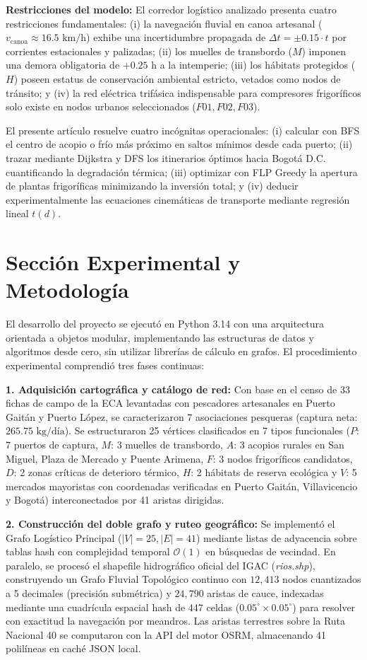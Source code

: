 \documentclass[10pt,twocolumn,a4paper]{article}
\begin{document}
\textbf{Restricciones del modelo:} El corredor logístico analizado presenta cuatro restricciones fundamentales: (i) la navegación fluvial en canoa artesanal ($v_{\text{canoa}} \approx 16.5\text{ km/h}$) exhibe una incertidumbre propagada de $\Delta t = \pm 0.15 \cdot t$ por corrientes estacionales y palizadas; (ii) los muelles de transbordo ($M$) imponen una demora obligatoria de $+0.25\text{ h}$ a la intemperie; (iii) los hábitats protegidos ($H$) poseen estatus de conservación ambiental estricto, vetados como nodos de tránsito; y (iv) la red eléctrica trifásica indispensable para compresores frigoríficos solo existe en nodos urbanos seleccionados ($F01, F02, F03$).

El presente artículo resuelve cuatro incógnitas operacionales: (i) calcular con BFS el centro de acopio o frío más próximo en saltos mínimos desde cada puerto; (ii) trazar mediante Dijkstra y DFS los itinerarios óptimos hacia Bogotá D.C. cuantificando la degradación térmica; (iii) optimizar con FLP Greedy la apertura de plantas frigoríficas minimizando la inversión total; y (iv) deducir experimentalmente las ecuaciones cinemáticas de transporte mediante regresión lineal $t(d)$.

\section{Sección Experimental y Metodología}
El desarrollo del proyecto se ejecutó en Python 3.14 con una arquitectura orientada a objetos modular, implementando las estructuras de datos y algoritmos desde cero, sin utilizar librerías de cálculo en grafos. El procedimiento experimental comprendió tres fases continuas:

\textbf{1. Adquisición cartográfica y catálogo de red:} Con base en el censo de 33 fichas de campo de la ECA levantadas con pescadores artesanales en Puerto Gaitán y Puerto López, se caracterizaron 7 asociaciones pesqueras (captura neta: $265.75\text{ kg/día}$). Se estructuraron 25 vértices clasificados en 7 tipos funcionales ($P$: 7 puertos de captura, $M$: 3 muelles de transbordo, $A$: 3 acopios rurales en San Miguel, Plaza de Mercado y Puente Arimena, $F$: 3 nodos frigoríficos candidatos, $D$: 2 zonas críticas de deterioro térmico, $H$: 2 hábitats de reserva ecológica y $V$: 5 mercados mayoristas con coordenadas verificadas en Puerto Gaitán, Villavicencio y Bogotá) interconectados por 41 aristas dirigidas.

\textbf{2. Construcción del doble grafo y ruteo geográfico:} Se implementó el Grafo Logístico Principal ($|V|=25, |E|=41$) mediante listas de adyacencia sobre tablas hash con complejidad temporal $\mathcal{O}(1)$ en búsquedas de vecindad. En paralelo, se procesó el shapefile hidrográfico oficial del IGAC (\textit{rios.shp}), construyendo un Grafo Fluvial Topológico continuo con $12,413$ nodos cuantizados a 5 decimales (precisión submétrica) y $24,790$ aristas de cauce, indexadas mediante una cuadrícula espacial hash de 447 celdas ($0.05^\circ \times 0.05^\circ$) para resolver con exactitud la navegación por meandros. Las aristas terrestres sobre la Ruta Nacional 40 se computaron con la API del motor OSRM, almacenando 41 polilíneas en caché JSON local.
\end{document}
